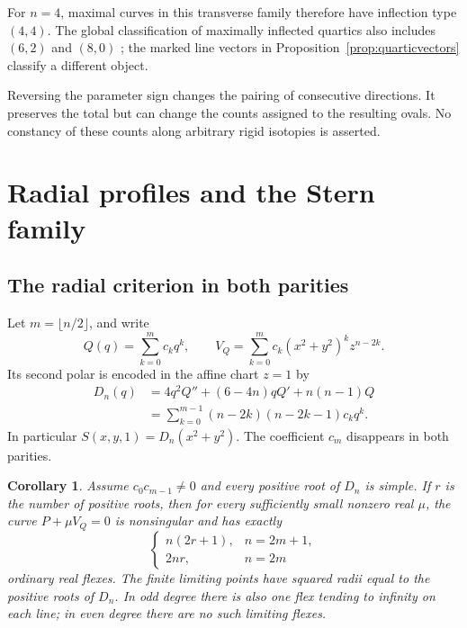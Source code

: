 \documentclass[11pt,a4paper]{article}
\newtheorem{corollary}[theorem]{Corollary}
\theoremstyle{remark}
\begin{document}
For \(n=4\), maximal curves in this transverse family therefore have
inflection type \((4,4)\). The global classification of maximally
inflected quartics also includes \((6,2)\) and \((8,0)\)
\citep[Proposition~7.1]{brugallelopez}; the marked line vectors in
Proposition~\ref{prop:quarticvectors} classify a different object.

Reversing the parameter sign changes the pairing of consecutive
directions. It preserves the total but can change the counts
assigned to the resulting ovals. No constancy of these counts
along arbitrary rigid isotopies is asserted.

\section{Radial profiles and the Stern family}\label{sec:radial}

\subsection{The radial criterion in both parities}

Let \(m=\lfloor n/2\rfloor\), and write
\begin{equation}\label{eq:radial}
 Q(q)=\sum_{k=0}^m c_kq^k,\qquad
 V_Q=\sum_{k=0}^m c_k(x^2+y^2)^kz^{n-2k}.
\end{equation}
Its second polar is encoded in the affine chart \(z=1\) by
\begin{equation}\label{eq:D}
\begin{split}
 D_n(q)&=4q^2Q''+(6-4n)qQ'+n(n-1)Q\\
       &=\sum_{k=0}^{m-1}(n-2k)(n-2k-1)c_kq^k.
\end{split}
\end{equation}
In particular \(S(x,y,1)=D_n(x^2+y^2)\).
The coefficient \(c_m\) disappears in both parities.

\begin{corollary}\label{cor:radial}
Assume \(c_0c_{m-1}\ne0\) and every positive root of \(D_n\)
is simple. If \(r\) is the number of positive roots, then for
every sufficiently small nonzero real \(\mu\), the curve
\(P+\mu V_Q=0\) is nonsingular and has exactly
\[
 \begin{cases}
 n(2r+1),&n=2m+1,\\
 2nr,&n=2m
 \end{cases}
\]
ordinary real flexes. The finite limiting points have squared
radii equal to the positive roots of \(D_n\). In odd degree
there is also one flex tending to infinity on each line; in
even degree there are no such limiting flexes.
\end{corollary}
\end{document}
